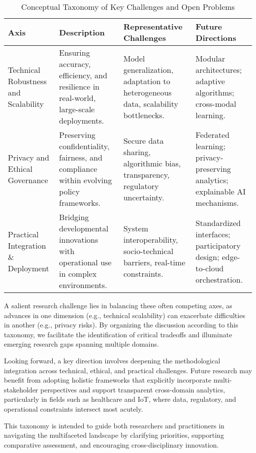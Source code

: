 \documentclass[sigconf]{acmart}
\begin{document}
\begin{table*}[htbp]
\centering
\caption{Conceptual Taxonomy of Key Challenges and Open Problems}
\label{tab:taxonomy_challenges}
\begin{adjustbox}{max width=\textwidth}
\begin{tabular}{@{}llll@{}}
\toprule
Axis & Description & Representative Challenges & Future Directions \\ \midrule
Technical Robustness and Scalability & Ensuring accuracy, efficiency, and resilience in real-world, large-scale deployments. & Model generalization, adaptation to heterogeneous data, scalability bottlenecks. & Modular architectures; adaptive algorithms; cross-modal learning. \\
Privacy and Ethical Governance & Preserving confidentiality, fairness, and compliance within evolving policy frameworks. & Secure data sharing, algorithmic bias, transparency, regulatory uncertainty. & Federated learning; privacy-preserving analytics; explainable AI mechanisms. \\
Practical Integration \& Deployment & Bridging developmental innovations with operational use in complex environments. & System interoperability, socio-technical barriers, real-time constraints. & Standardized interfaces; participatory design; edge-to-cloud orchestration. \\ \bottomrule
\end{tabular}
\end{adjustbox}
\end{table*}

A salient research challenge lies in balancing these often competing axes, as advances in one dimension (e.g., technical scalability) can exacerbate difficulties in another (e.g., privacy risks). By organizing the discussion according to this taxonomy, we facilitate the identification of critical tradeoffs and illuminate emerging research gaps spanning multiple domains.

Looking forward, a key direction involves deepening the methodological integration across technical, ethical, and practical challenges. Future research may benefit from adopting holistic frameworks that explicitly incorporate multi-stakeholder perspectives and support transparent cross-domain analytics, particularly in fields such as healthcare and IoT, where data, regulatory, and operational constraints intersect most acutely.

This taxonomy is intended to guide both researchers and practitioners in navigating the multifaceted landscape by clarifying priorities, supporting comparative assessment, and encouraging cross-disciplinary innovation.
\end{document}
